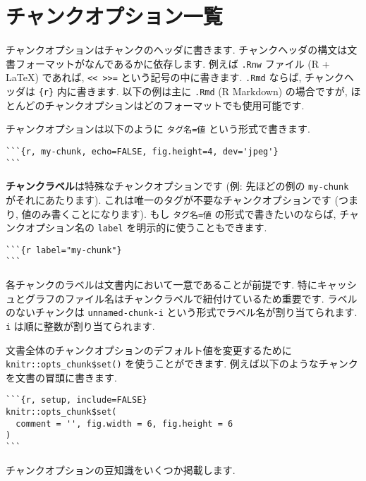 \documentclass[
  11pt,
  lualatex,ja=standard,jafont=noto]{bxjsreport}
\begin{document}
\hypertarget{chunk-options-full}{%
\section{チャンクオプション一覧}\label{chunk-options-full}}

チャンクオプションはチャンクのヘッダに書きます. チャンクヘッダの構文は文書フォーマットがなんであるかに依存します. 例えば \texttt{.Rnw} ファイル (R + LaTeX) であれば, \texttt{\textless{}\textless{}\ \textgreater{}\textgreater{}=} という記号の中に書きます. \texttt{.Rmd} ならば, チャンクヘッダは \texttt{\textasciigrave{}\textasciigrave{}\textasciigrave{}\{r\}} 内に書きます. 以下の例は主に \texttt{.Rmd} (R Markdown) の場合ですが, ほとんどのチャンクオプションはどのフォーマットでも使用可能です.

チャンクオプションは以下のように \texttt{タグ名=値} という形式で書きます.

\begin{verbatim}
```{r, my-chunk, echo=FALSE, fig.height=4, dev='jpeg'}
```
\end{verbatim}

\textbf{チャンクラベル}は特殊なチャンクオプションです (例: 先ほどの例の \texttt{my-chunk} がそれにあたります). これは唯一のタグが不要なチャンクオプションです (つまり, 値のみ書くことになります). もし \texttt{タグ名=値} の形式で書きたいのならば, チャンクオプション名の \texttt{label} を明示的に使うこともできます.

\begin{verbatim}
```{r label="my-chunk"}
```
\end{verbatim}

各チャンクのラベルは文書内において一意であることが前提です. 特にキャッシュとグラフのファイル名はチャンクラベルで紐付けているため重要です. ラベルのないチャンクは \texttt{unnamed-chunk-i} という形式でラベル名が割り当てられます. \texttt{i} は順に整数が割り当てられます.

文書全体のチャンクオプションのデフォルト値を変更するために \texttt{knitr::opts\_chunk\$set()} を使うことができます. 例えば以下のようなチャンクを文書の冒頭に書きます.

\begin{verbatim}
```{r, setup, include=FALSE}
knitr::opts_chunk$set(
  comment = '', fig.width = 6, fig.height = 6
)
```
\end{verbatim}

チャンクオプションの豆知識をいくつか掲載します.
\end{document}
